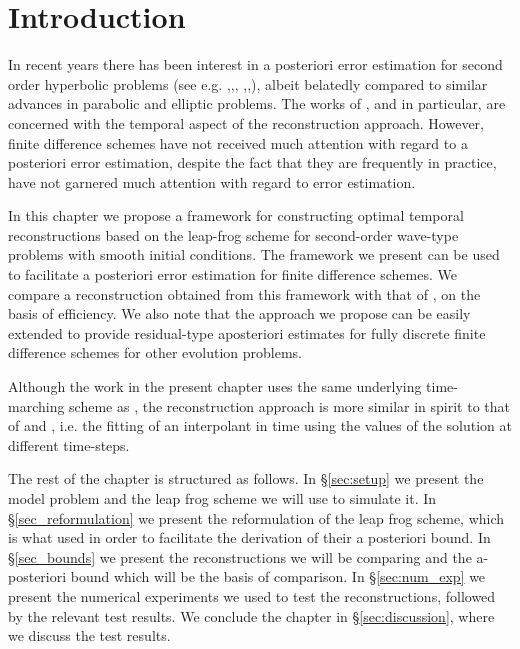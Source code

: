 \documentclass[12pt,a4paper]{article}
\numberwithin{equation}{section}
\theoremstyle{definition}
\begin{document}
\section{Introduction}\label{sec_intro}

In recent years there has been interest in a posteriori error estimation for second order hyperbolic problems (see e.g. \cite{bernardi2005time},\cite{georgoulis2013posteriori},\cite{georgoulis2016posteriori}, \cite{gorynina2018elements},\cite{gorynina2019time},\cite{gorynina2019easily}), albeit belatedly compared to similar advances in parabolic and elliptic problems. The works of \cite{georgoulis2016posteriori}, \cite{gorynina2019time} and  \cite{gorynina2019easily} in particular, are concerned with the temporal aspect of the reconstruction approach.  However, finite difference schemes have not received much attention with regard to a posteriori error estimation, despite the fact that they are frequently in practice,  have not garnered much attention with regard to error estimation.

In this chapter we propose a framework for constructing optimal temporal reconstructions based on the leap-frog scheme for second-order wave-type problems with smooth initial conditions.  The framework we present can be used to facilitate  a posteriori error estimation for finite difference schemes.  We compare a reconstruction obtained from this framework with that of \cite{georgoulis2016posteriori}, on the basis of efficiency.   We also note that the approach we propose can be easily extended to provide residual-type aposteriori estimates for fully discrete finite difference schemes for other evolution problems.  

 

  Although the work in the present chapter uses the same underlying time-marching scheme as \cite{georgoulis2016posteriori}, the reconstruction approach is more similar in spirit to that of  \cite{gorynina2019time} and \cite{gorynina2019easily},  i.e. the fitting of an interpolant in time using the values of the solution at different time-steps.


The rest of the chapter is structured as follows.  In \S \ref{sec:setup} we present the model problem and the leap frog scheme we will use to simulate it.  In \S\ref{sec_reformulation} we present the reformulation of the leap frog scheme, which is what  \cite{georgoulis2016posteriori} used in order to facilitate the derivation of their a posteriori bound.  In \S \ref{sec_bounds} we present the reconstructions we will be comparing and the a-posteriori bound which will be the basis of comparison.   In \S \ref{sec:num_exp} we present the numerical experiments we used to test the reconstructions, followed by the relevant test results.  We conclude the chapter in \S \ref{sec:discussion}, where we  discuss the test results.
\end{document}
